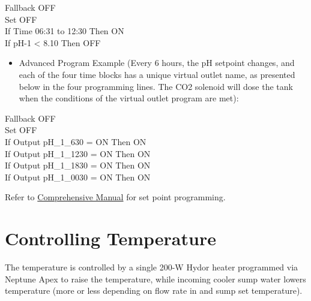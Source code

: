 \documentclass[
]{book}
\providecommand{\tightlist}{%
  \setlength{\itemsep}{0pt}\setlength{\parskip}{0pt}}
\begin{document}
\begin{enumerate}
  Fallback OFF\\
  Set OFF\\
  If Time 06:31 to 12:30 Then ON\\
  If pH-1 \textless{} 8.10 Then OFF

  \begin{itemize}
  \tightlist
  \item
    Advanced Program Example (Every 6 hours, the pH setpoint changes, and each of the four time blocks has a unique virtual outlet name, as presented below in the four programming lines. The CO2 solenoid will dose the tank when the conditions of the virtual outlet program are met):
  \end{itemize}

  Fallback OFF\\
  Set OFF\\
  If Output pH\_1\_630 = ON Then ON\\
  If Output pH\_1\_1230 = ON Then ON\\
  If Output pH\_1\_1830 = ON Then ON\\
  If Output pH\_1\_0030 = ON Then ON
\end{enumerate}

Refer to \href{https://github.com/SilbigerLab/Mesocosm_User_Manual/tree/7503b88686aef920c4a4ed473b1efe37b34dae10/Manuals/Apex_Comprehensive_Reference_Manual.pdf}{Comprehensive Manual} for set point programming.

\hypertarget{controlling-temperature}{%
\chapter{Controlling Temperature}\label{controlling-temperature}}

The temperature is controlled by a single 200-W Hydor heater programmed via Neptune Apex to raise the temperature, while incoming cooler sump water lowers temperature (more or less depending on flow rate in and sump set temperature).
\end{document}
